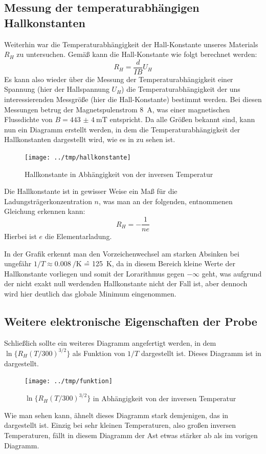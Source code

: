 \subsection{Messung der temperaturabhängigen Hallkonstanten}

Weiterhin war die Temperaturabhängigkeit der Hall-Konstante unseres Materials
$R_H$ zu untersuchen. Gemäß \cite[Gl. (XIV.2)]{ibach} kann die Hall-Konstante
wie folgt berechnet werden: 
\begin{equation}
R_H = \frac{d}{I B} U_H
\end{equation}
Es kann also wieder über die Messung der Temperaturabhängigkeit einer Spannung
(hier der Hallspannung $U_H$) die Temperaturabhängigkeit der uns
interessierenden Messgröße (hier die Hall-Konstante) bestimmt werden. Bei
diesen Messungen betrug der Magnetspulenstrom \SI{8}{\ampere}, was einer
magnetischen Flussdichte von $B=\SI{443(4)}{\milli\tesla}$ entspricht.
Da alle Größen bekannt sind, kann nun ein Diagramm erstellt werden, in dem die
Temperaturabhängigkeit der Hallkonstanten dargestellt wird, wie es in
 zu sehen ist.
\begin{figure}[htb]
   \centering
   \texttt{[image: ../tmp/hallkonstante]}
   \caption{Hallkonstante in Abhängigkeit von der inversen Temperatur}
   \label{fig:hallkonstante}
\end{figure}

Die Hallkonstante ist in gewisser Weise ein Maß für die
Ladungsträgerkonzentration $n$, was man an der folgenden, \cite{ibach}
entnommenen Gleichung erkennen kann:
\begin{equation}
R_H = -\frac{1}{ne}
\end{equation}
Hierbei ist $e$ die Elementarladung.

In der Grafik erkennt man den Vorzeichenwechsel am starken Absinken bei
ungefähr $1/T \approx \SI{0.008}{\per\kelvin}$ \^{=} \SI{125}{\kelvin}, da in
diesem Bereich kleine Werte der Hallkonstante vorliegen und somit der
Lorarithmus gegen $-\infty$ geht, was aufgrund der nicht exakt null werdenden
Hallkonstante nicht der Fall ist, aber dennoch wird hier deutlich das globale
Minimum eingenommen. 

\subsection{Weitere elektronische Eigenschaften der Probe}

Schließlich sollte ein weiteres Diagramm angefertigt werden, in dem
$\ln\{R_H(T/300)^{3/2}\}$ als Funktion von $1/T$ dargestellt ist. Dieses
Diagramm ist in  dargestellt.

\begin{figure}[htb]
   \centering
   \texttt{[image: ../tmp/funktion]}
   \caption{$\ln\{R_H(T/300)^{3/2}\}$ in Abhängigkeit von der inversen
   Temperatur}
   \label{fig:funktion}
\end{figure}

Wie man sehen kann, ähnelt dieses Diagramm stark demjenigen, das in
 dargestellt ist. Einzig bei sehr kleinen Temperaturen,
also großen inversen Temperaturen, fällt in diesem Diagramm der Ast etwas
stärker ab als im vorigen Diagramm.